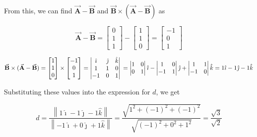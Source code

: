 From this, we can find \( \vec{\mathbf{A}} - \vec{\mathbf{B}} \) and \( \vec{\mathbf{B}} \times (\vec{\mathbf{A}} - \vec{\mathbf{B}}) \) as

\[
    \vec{\mathbf{A}} - \vec{\mathbf{B}} = \begin{bmatrix} 0 \\ 1 \\ 1 \end{bmatrix} - \begin{bmatrix} 1 \\ 1 \\ 0 \end{bmatrix} = \begin{bmatrix} -1 \\ 0 \\ 1 \end{bmatrix}
\]

\[
    \vec{\mathbf{B}} \times (\vec{\mathbf{A}} - \vec{\mathbf{B}})
    = \begin{bmatrix} 1 \\ 1 \\ 0 \end{bmatrix} \times \begin{bmatrix} -1 \\ 0 \\ 1 \end{bmatrix}
    = \begin{vmatrix} \hat{\imath} & \hat{\jmath} & \hat{k} \\ 1 & 1 & 0 \\ -1 & 0 & 1 \end{vmatrix} \\
    = \begin{vmatrix} 1 & 0 \\ 0 & 1 \end{vmatrix} \hat{\imath} - \begin{vmatrix} 1 & 0 \\ -1 & 1 \end{vmatrix} \hat{\jmath} + \begin{vmatrix} 1 & 1 \\ -1 & 0 \end{vmatrix} \hat{k}
    = 1 \hat{\imath} - 1 \hat{\jmath} - 1 \hat{k}
\]

Substituting these values into the expression for \( d \), we get

\[
    d = \frac{\left\lVert 1 \hat{\imath} - 1 \hat{\jmath} - 1 \hat{k} \right\rVert}{\left\lVert -1 \hat{\imath} + 0 \hat{\jmath} + 1 \hat{k} \right\rVert}
    = \frac{\sqrt{1^2 + {(-1)}^2 + {(-1)}^2}}{\sqrt{{(-1)}^2 + 0^2 + 1^2}}
    = \frac{\sqrt{3}}{\sqrt{2}}
\]


